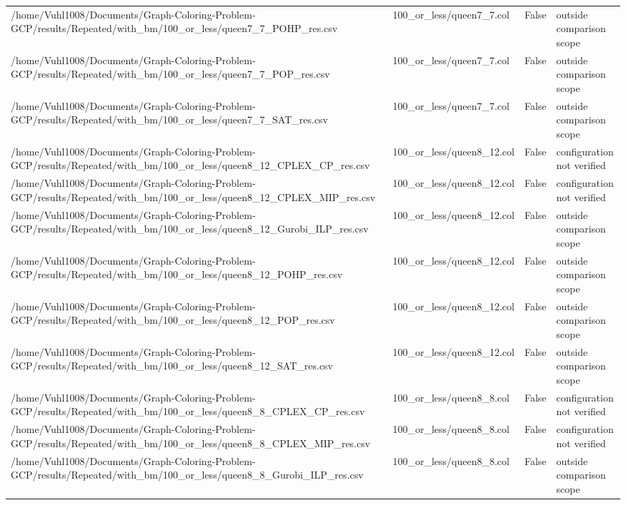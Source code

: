\begin{table}[htbp]
\begin{tabular}{llll}
/home/Vuhl1008/Documents/Graph-Coloring-Problem-GCP/results/Repeated/with\_bm/100\_or\_less/queen7\_7\_POHP\_res.csv & 100\_or\_less/queen7\_7.col & False & outside comparison scope \\
/home/Vuhl1008/Documents/Graph-Coloring-Problem-GCP/results/Repeated/with\_bm/100\_or\_less/queen7\_7\_POP\_res.csv & 100\_or\_less/queen7\_7.col & False & outside comparison scope \\
/home/Vuhl1008/Documents/Graph-Coloring-Problem-GCP/results/Repeated/with\_bm/100\_or\_less/queen7\_7\_SAT\_res.csv & 100\_or\_less/queen7\_7.col & False & outside comparison scope \\
/home/Vuhl1008/Documents/Graph-Coloring-Problem-GCP/results/Repeated/with\_bm/100\_or\_less/queen8\_12\_CPLEX\_CP\_res.csv & 100\_or\_less/queen8\_12.col & False & configuration not verified \\
/home/Vuhl1008/Documents/Graph-Coloring-Problem-GCP/results/Repeated/with\_bm/100\_or\_less/queen8\_12\_CPLEX\_MIP\_res.csv & 100\_or\_less/queen8\_12.col & False & configuration not verified \\
/home/Vuhl1008/Documents/Graph-Coloring-Problem-GCP/results/Repeated/with\_bm/100\_or\_less/queen8\_12\_Gurobi\_ILP\_res.csv & 100\_or\_less/queen8\_12.col & False & outside comparison scope \\
/home/Vuhl1008/Documents/Graph-Coloring-Problem-GCP/results/Repeated/with\_bm/100\_or\_less/queen8\_12\_POHP\_res.csv & 100\_or\_less/queen8\_12.col & False & outside comparison scope \\
/home/Vuhl1008/Documents/Graph-Coloring-Problem-GCP/results/Repeated/with\_bm/100\_or\_less/queen8\_12\_POP\_res.csv & 100\_or\_less/queen8\_12.col & False & outside comparison scope \\
/home/Vuhl1008/Documents/Graph-Coloring-Problem-GCP/results/Repeated/with\_bm/100\_or\_less/queen8\_12\_SAT\_res.csv & 100\_or\_less/queen8\_12.col & False & outside comparison scope \\
/home/Vuhl1008/Documents/Graph-Coloring-Problem-GCP/results/Repeated/with\_bm/100\_or\_less/queen8\_8\_CPLEX\_CP\_res.csv & 100\_or\_less/queen8\_8.col & False & configuration not verified \\
/home/Vuhl1008/Documents/Graph-Coloring-Problem-GCP/results/Repeated/with\_bm/100\_or\_less/queen8\_8\_CPLEX\_MIP\_res.csv & 100\_or\_less/queen8\_8.col & False & configuration not verified \\
/home/Vuhl1008/Documents/Graph-Coloring-Problem-GCP/results/Repeated/with\_bm/100\_or\_less/queen8\_8\_Gurobi\_ILP\_res.csv & 100\_or\_less/queen8\_8.col & False & outside comparison scope \\

\end{tabular}
\end{table}
